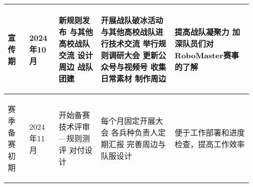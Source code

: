 \begin{longtable}{ X | X | X | X | X }
        \begin{center}
            宣传期
        \end{center}&
        \begin{center}
            2024年10月
        \end{center}&
        \begin{center}
            新规则发布
            \newline 与其他高校战队交流
            \newline 设计周边
            \newline 战队团建
        \end{center}&
        \begin{center}
             开展战队破冰活动
            \newline 与其他高校战队进行技术交流
            \newline 举行规则调研大会
            \newline 更新公众号与视频号
            \newline 收集日常素材
            \newline 制作周边
        \end{center}&
        \begin{center}
            提高战队凝聚力
            \newline 加深队员们对RoboMaster赛事的了解
        \end{center}\\
    
    \hline

        \begin{center}
            赛季备赛初期
        \end{center}&
        \begin{center}
            2024年11月
        \end{center}&
        \begin{center}
            开始备赛
            \newline 技术评审—规则测评
            \newline 对付设计
        \end{center}&
        \begin{center}
            每个月固定开展大会
            \newline 各兵种负责人定期汇报
            \newline 完善周边与队服设计
        \end{center}&
        \begin{center}
            便于工作部署和进度检查，提高工作效率
        \end{center}\\
    

\end{longtable}
